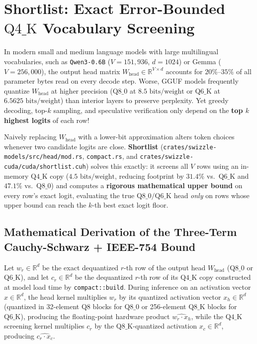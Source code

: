 \documentclass[10pt,a4paper]{article}
\theoremstyle{swzstyle}
\newcommand{\code}[1]{\texttt{#1}}
\begin{document}
\section{Shortlist: Exact Error-Bounded $\text{Q4\_K}$ Vocabulary Screening}

In modern small and medium language models with large multilingual vocabularies, such as \code{Qwen3-0.6B} ($V = 151,936$, $d = 1024$) or Gemma ($V = 256,000$), the output head matrix $W_{\text{head}} \in \mathbb{R}^{V \times d}$ accounts for $20\%\text{--}35\%$ of all parameter bytes read on every decode step. Worse, GGUF models frequently quantize $W_{\text{head}}$ at higher precision ($\text{Q8\_0}$ at $8.5\text{ bits/weight}$ or $\text{Q6\_K}$ at $6.5625\text{ bits/weight}$) than interior layers to preserve perplexity. Yet greedy decoding, top-$k$ sampling, and speculative verification only depend on the \textbf{top $k$ highest logits} of each row!

Naively replacing $W_{\text{head}}$ with a lower-bit approximation alters token choices whenever two candidate logits are close. \textbf{Shortlist} (\code{crates/swizzle-models/src/head/mod.rs}, \code{compact.rs}, and \code{crates/swizzle-cuda/cuda/shortlist.cuh}) solves this exactly: it screens all $V$ rows using an in-memory $\text{Q4\_K}$ copy ($4.5\text{ bits/weight}$, reducing footprint by $31.4\%$ vs.\ $\text{Q6\_K}$ and $47.1\%$ vs.\ $\text{Q8\_0}$) and computes a \textbf{rigorous mathematical upper bound} on every row's exact logit, evaluating the true $\text{Q8\_0}/\text{Q6\_K}$ head \emph{only} on rows whose upper bound can reach the $k$-th best exact logit floor.

\subsection{Mathematical Derivation of the Three-Term Cauchy-Schwarz + IEEE-754 Bound}

Let $w_r \in \mathbb{R}^d$ be the exact dequantized $r$-th row of the output head $W_{\text{head}}$ ($\text{Q8\_0}$ or $\text{Q6\_K}$), and let $c_r \in \mathbb{R}^d$ be the dequantized $r$-th row of its $\text{Q4\_K}$ copy constructed at model load time by \code{compact::build}. During inference on an activation vector $x \in \mathbb{R}^d$, the head kernel multiplies $w_r$ by its quantized activation vector $x_h \in \mathbb{R}^d$ (quantized in 32-element $\text{Q8}$ blocks for $\text{Q8\_0}$ or 256-element $\text{Q8\_K}$ blocks for $\text{Q6\_K}$), producing the floating-point hardware product $\widehat{w_r \cdot x_h}$, while the $\text{Q4\_K}$ screening kernel multiplies $c_r$ by the $\text{Q8\_K}$-quantized activation $x_c \in \mathbb{R}^d$, producing $\widehat{c_r \cdot x_c}$.
\end{document}
